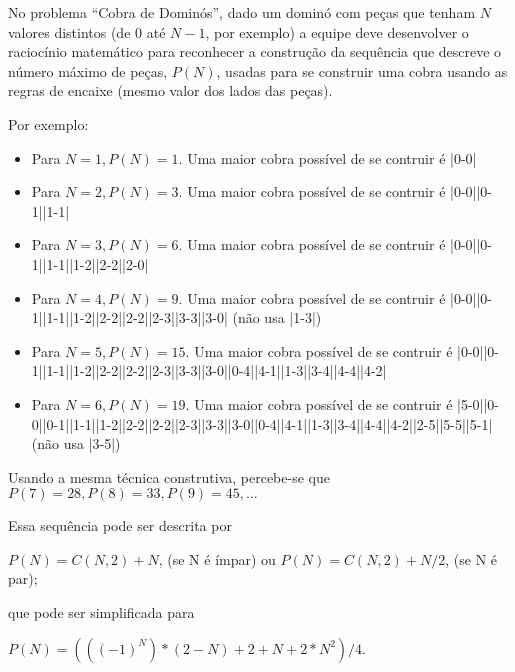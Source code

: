 % 

No problema ``Cobra de Dominós'', dado um dominó com peças que tenham $N$ valores distintos (de $0$ até $N-1$, por exemplo) a equipe deve desenvolver o raciocínio matemático para reconhecer a construção da sequência que descreve o número máximo de peças, $P(N)$, usadas para se construir uma cobra usando as regras de encaixe (mesmo valor dos lados das peças).

Por exemplo:

\begin{itemize}
\item Para $N = 1, P(N) = 1$.  Uma maior cobra possível de se contruir é |0-0|
\item Para $N = 2, P(N) = 3$.  Uma maior cobra possível de se contruir é |0-0||0-1||1-1|
\item Para $N = 3, P(N) = 6$.  Uma maior cobra possível de se contruir é |0-0||0-1||1-1||1-2||2-2||2-0|
\item Para $N = 4, P(N) = 9$.  Uma maior cobra possível de se contruir é |0-0||0-1||1-1||1-2||2-2||2-2||2-3||3-3||3-0| (não usa |1-3|)
\item Para $N = 5, P(N) = 15$. Uma maior cobra possível de se contruir é |0-0||0-1||1-1||1-2||2-2||2-2||2-3||3-3||3-0||0-4||4-1||1-3||3-4||4-4||4-2|
\item Para $N = 6, P(N) = 19$. Uma maior cobra possível de se contruir é |5-0||0-0||0-1||1-1||1-2||2-2||2-2||2-3||3-3||3-0||0-4||4-1||1-3||3-4||4-4||4-2||2-5||5-5||5-1| (não usa |3-5|)
\end{itemize}

Usando a mesma técnica construtiva, percebe-se que $P(7) = 28, P(8) = 33, P(9) = 45, \ldots$

Essa sequência pode ser descrita por

$P(N) = C(N, 2) + N$, (se N é ímpar) ou $P(N) = C(N, 2) + N/2$, (se N é par);

que pode ser simplificada para

$P(N) = (( (-1)^N ) * (2 - N) + 2 + N + 2*N^2)/4$.
